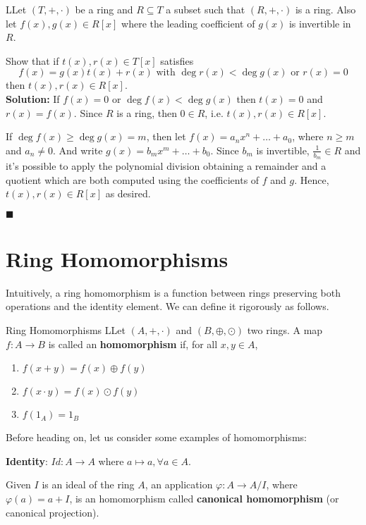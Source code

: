 \documentclass[12pt,a4paper]{article}
\begin{document}
\begin{example}{}
LLet $(T,+,\cdot)$ be a ring and $R \subseteq T$ a subset such that $(R,+,\cdot)$ is a ring. Also let $f(x), g(x) \in R[x]$ where the leading coefficient of $g(x)$ is invertible in $R$.

Show that if $t(x), r(x) \in T[x]$ satisfies
\[
f(x) = g(x) t(x) + r(x) \text{ with } \deg r(x) < \deg g(x) \text{ or } r(x) = 0
\]
then $t(x), r(x) \in R[x]$. \\

\textbf{Solution: } If $f(x) = 0$ or $\deg f(x) < \deg g(x)$ then $t(x) = 0$ and $r(x) = f(x)$. Since $R$ is a ring, then $0 \in R$, i.e. $t(x), r(x) \in R[x]$.

If $\deg f(x) \geq \deg g(x) = m$, then let $f(x) = a_nx^n + \ldots + a_0$, where $n \geq m$ and $a_n \neq 0$. And write $g(x) = b_m x^m + \ldots + b_0$. Since $b_m$ is invertible, $\frac{1}{b_m} \in R$ and it's possible to apply the polynomial division obtaining a remainder and a quotient which are both computed using the coefficients of $f$ and $g$. Hence,  $t(x), r(x) \in R[x]$ as desired.

\hfill $\blacksquare$
\end{example}

\section{Ring Homomorphisms}

Intuitively, a ring homomorphism is a function between rings preserving both operations and the identity element. We can define it rigorously as follows.

\begin{defn}{Ring Homomorphisms}
LLet $(A,+, \cdot)$ and $(B,\oplus,\odot)$ two rings. A map $f:A \to B$ is called an \textbf{homomorphism} if, for all $x,y \in A$,
\begin{enumerate}
\item $f(x+y) = f(x) \oplus f(y)$
\item $f(x \cdot y) = f(x) \odot f(y)$
\item $f(1_A) = 1_B$
\end{enumerate}
\end{defn}

Before heading on, let us consider some examples of homomorphisms:

\textbf{Identity}: $Id: A \to A$ where $a \mapsto a, \forall a \in A$.

Given $I$ is an ideal of the ring $A$, an application $\varphi: A \to A/I$, where $\varphi(a) = a+I$, is an homomorphism called \textbf{canonical homomorphism} (or canonical projection).
\end{document}
